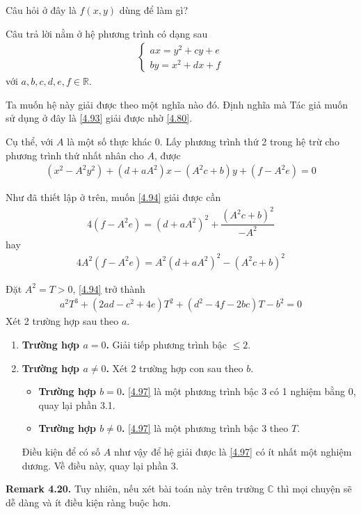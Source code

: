 \documentclass[a4paper,oneside]{book}
\numberwithin{equation}{chapter}
\begin{document}
Câu hỏi ở đây là $f(x,y)$ dùng để làm gì?

Câu trả lời nằm ở hệ phương trình có dạng sau
\begin{align}
\label{4.93}
\left\{ {\begin{array}{*{20}{c}}
{ax = {y^2} + cy + e}\\
{by = {x^2} + dx + f}
\end{array}} \right.
\end{align}
với $a,b,c,d,e,f \in \mathbb{R}$.

Ta muốn hệ này giải được theo một nghĩa nào đó. Định nghĩa mà Tác giả muốn sử dụng ở đây là \eqref{4.93} giải được nhờ \eqref{4.80}.

Cụ thể, với $A$ là một số thực khác 0. Lấy phương trình thứ 2 trong hệ trừ cho phương trình thứ nhất nhân cho $A$, được
\begin{align}
\label{4.94}
\left( {{x^2} - {A^2}{y^2}} \right) + \left( {d + a{A^2}} \right)x - \left( {{A^2}c + b} \right)y + \left( {f - {A^2}e} \right) = 0
\end{align}

Như đã thiết lập ở trên, muốn \eqref{4.94} giải được cần
\begin{align}
4\left( {f - {A^2}e} \right) = {\left( {d + a{A^2}} \right)^2} + \dfrac{{{{\left( {{A^2}c + b} \right)}^2}}}{{ - {A^2}}}
\end{align}
hay
\begin{align}
4{A^2}\left( {f - {A^2}e} \right) = {A^2}{\left( {d + a{A^2}} \right)^2} - {\left( {{A^2}c + b} \right)^2}
\end{align}

Đặt ${A^2} = T > 0$, \eqref{4.94} trở thành
\begin{align}
\label{4.97}
{a^2}{T^3} + \left( {2ad - {c^2} + 4e} \right){T^2} + \left( {{d^2} - 4f - 2bc} \right)T - {b^2} = 0
\end{align}
Xét 2 trường hợp sau theo $a$.
\begin{enumerate}
\item \textbf{Trường hợp $a=0$.} Giải tiếp phương trình bậc $ \le 2$.
\item \textbf{Trường hợp $a \ne 0$.} Xét 2 trường hợp con sau theo $b$.
\begin{itemize}
\item \textbf{Trường hợp $b=0$.} \eqref{4.97} là một phương trình bậc 3 có 1 nghiệm bằng 0, quay lại phần 3.1.
\item \textbf{Trường hợp $b \ne 0$.} \eqref{4.97} là một phương trình bậc 3 theo $T$.
\end{itemize}
Điều kiện để có số $A$ như vậy để hệ giải được là \eqref{4.97} có ít nhất một nghiệm dương. Về điều này, quay lại phần 3.
\end{enumerate}
\vspace{0.5cm}
\textbf{Remark 4.20.} Tuy nhiên, nếu xét bài toán này trên trường $\mathbb{C}$ thì mọi chuyện sẽ dễ dàng và ít điều kiện ràng buộc hơn.
\end{document}
